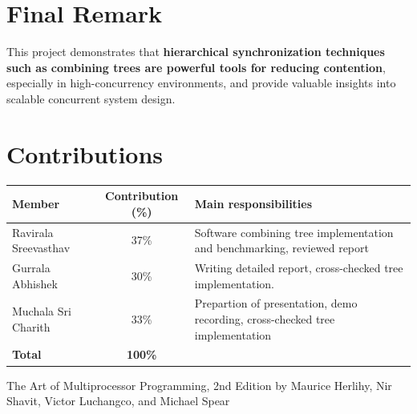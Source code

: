\documentclass[11pt,a4paper]{article}
\begin{document}
\section*{Final Remark}
\label{sec:final remark}
This project demonstrates that \textbf{hierarchical synchronization techniques such as combining trees are powerful tools for reducing contention}, especially in high-concurrency environments, and provide valuable insights into scalable concurrent system design.


\section*{Contributions}
\label{sec:contributions}
\begin{center}
\begin{tabular}{@{}lcl@{}}
\toprule
\textbf{Member} & \textbf{Contribution (\%)} & \textbf{Main responsibilities} \\
\midrule
Ravirala Sreevasthav   & 37\% & Software combining tree implementation and benchmarking, reviewed report\\
Gurrala Abhishek   & 30\% & Writing detailed report, cross-checked tree implementation.\\
Muchala Sri Charith & 33\% & Prepartion of presentation, demo recording, cross-checked tree implementation\\
\midrule
\textbf{Total} & \textbf{100\%} & \\
\bottomrule
\end{tabular}
\end{center}



The Art of Multiprocessor Programming, 2nd Edition by Maurice Herlihy, Nir Shavit, Victor Luchangco, and Michael Spear
\end{document}
